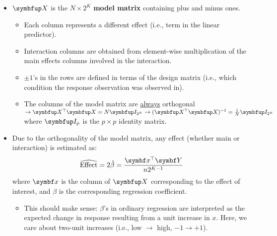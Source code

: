 \begin{itemize}
\begin{itemize}
              \item $ \Matrix{X} $ is the $ N\times 2^K $ \textbf{model matrix} containing plus and minus ones.
                    \begin{itemize}
                        \item Each column represents a different effect (i.e., term in the linear predictor).
                        \item Interaction columns are obtained from element-wise multiplication of the main effects columns involved in the interaction.
                        \item $ \pm 1 $'s in the rows are defined in terms of the design matrix (i.e., which condition the response observation was observed in).
                        \item The columns of the model matrix are \underline{always} orthogonal $ \rightarrow \Matrix{X}^\top \Matrix{X}=N\Matrix{I}_{2^K}
                                  \rightarrow (\Matrix{X}^\top \Matrix{X})^{-1}=\frac{1}{N}\Matrix{I}_{2^K}$ where $ \Matrix{I}_p $ is the $ p\times p $
                              identity matrix.
                    \end{itemize}
              \item Due to the orthogonality of the model matrix, any effect (whether main or interaction) is estimated as:
                    \[ \widehat{\text{Effect}}=2\hat{\beta}=\frac{\Vector{x}^\top \RandomVector{Y}}{n 2^{K-1}}  \]
                    where $ \Vector{x} $ is the column of $ \Matrix{X} $ corresponding to the effect of interest, and $ \beta $ is the corresponding
                    regression coefficient.
                    \begin{itemize}[$\star$]
                        \item This should make sense: $ \beta $'s in ordinary regression are interpreted as the expected change in response
                              resulting from a unit increase in $ x $. Here, we care about two-unit increases (i.e., low $\rightarrow $ high, $-1\rightarrow +1$).
                    \end{itemize}
          \end{itemize}
\end{itemize}
